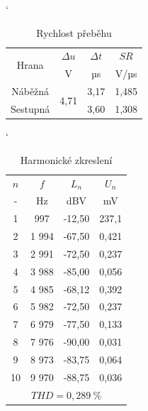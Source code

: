 \documentclass[a4paper, czech]{article}
\begin{document}
\begin{minipage}{0.48\textwidth}
    \begin{table}[H]
        \catcode`
        \centering
        \caption{Rychlost přeběhu}
        \begin{tabular}{cccccc}
            \toprule
            \multirow{2}{*}{Hrana} & \multicolumn{2}{c}{$\Delta u$}                    & \multicolumn{2}{c}{$\Delta t$}   & $SR$         \\
            \cmidrule(rl){2-3}
            \cmidrule(rl){4-5}
            \cmidrule(rl){6-6}
                                & \multicolumn{2}{c}{V}                     & \multicolumn{2}{c}{µs}   & V/µs       \\
            \midrule
            Náběžná                & \multicolumn{2}{l}{\multirow{2}{*}{4,71}} & \multicolumn{2}{l}{3,17} & 1,485 \\
            Sestupná               & \multicolumn{2}{l}{}                      & \multicolumn{2}{l}{3,60}  & 1,308 \\
            \bottomrule
        \end{tabular}
    \end{table}
\end{minipage}
\begin{minipage}{0.48\textwidth}
    \begin{table}[H]
        \catcode`
        \centering
        \caption{Harmonické zkreslení}
        \begin{tabular}{cccc}
            \toprule
            $n$  & $f$     & $L_n$      & $U_n$         \\
            \cmidrule(rl){1-1}
            \cmidrule(rl){2-2}
            \cmidrule(rl){3-3}
            \cmidrule(rl){4-4}
            -  & Hz    & dBV     & mV         \\
            \midrule
            1  & 997   & -12,50  & 237,1 \\
            2  & 1 994 & -67,50  & 0,421 \\
            3  & 2 991 & -72,50  & 0,237 \\
            4  & 3 988 & -85,00  & 0,056 \\
            5  & 4 985 & -68,12  & 0,392 \\
            6  & 5 982 & -72,50  & 0,237 \\
            7  & 6 979 & -77,50  & 0,133 \\
            8  & 7 976 & -90,00  & 0,031 \\
            9  & 8 973 & -83,75  & 0,064 \\
            10 & 9 970 & -88,75  & 0,036 \\
            \bottomrule
            \multicolumn{4}{c}{$THD = 0,289\ \%$}
        \end{tabular}
    \end{table}
\end{minipage}
\end{document}
